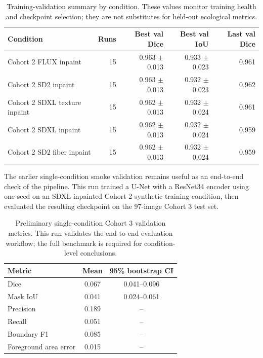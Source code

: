 \documentclass{article}
\begin{document}
\begin{table}[H]
  \centering
  \caption{Training-validation summary by condition. These values monitor training health and checkpoint selection; they are not substitutes for held-out ecological metrics.}
  \label{tab:validation-condition-results}
  \begin{tabular}{lrrrr}
    \toprule
    \textbf{Condition} & \textbf{Runs} & \textbf{Best val Dice} & \textbf{Best val IoU} & \textbf{Last val Dice} \\
    \midrule
    Cohort 2 FLUX inpaint & 15 & 0.963 $\pm$ 0.013 & 0.933 $\pm$ 0.023 & 0.961 \\
    Cohort 2 SD2 inpaint & 15 & 0.963 $\pm$ 0.013 & 0.932 $\pm$ 0.023 & 0.962 \\
    Cohort 2 SDXL texture inpaint & 15 & 0.962 $\pm$ 0.013 & 0.932 $\pm$ 0.024 & 0.961 \\
    Cohort 2 SDXL inpaint & 15 & 0.962 $\pm$ 0.013 & 0.932 $\pm$ 0.024 & 0.959 \\
    Cohort 2 SD2 fiber inpaint & 15 & 0.962 $\pm$ 0.013 & 0.932 $\pm$ 0.024 & 0.959 \\
    \bottomrule
  \end{tabular}
\end{table}

The earlier single-condition smoke validation remains useful as an end-to-end check of the pipeline. This run trained a U-Net with a ResNet34 encoder using one seed on an SDXL-inpainted Cohort 2 synthetic training condition, then evaluated the resulting checkpoint on the 97-image Cohort 3 test set.

\begin{table}[H]
  \centering
  \caption{Preliminary single-condition Cohort 3 validation metrics. This run validates the end-to-end evaluation workflow; the full benchmark is required for condition-level conclusions.}
  \label{tab:preliminary-validation}
  \begin{tabular}{lcc}
    \toprule
    \textbf{Metric} & \textbf{Mean} & \textbf{95\% bootstrap CI} \\
    \midrule
    Dice & 0.067 & 0.041--0.096 \\
    Mask IoU & 0.041 & 0.024--0.061 \\
    Precision & 0.189 & -- \\
    Recall & 0.051 & -- \\
    Boundary F1 & 0.085 & -- \\
    Foreground area error & 0.015 & -- \\
    \bottomrule
  \end{tabular}
\end{table}
\end{document}
